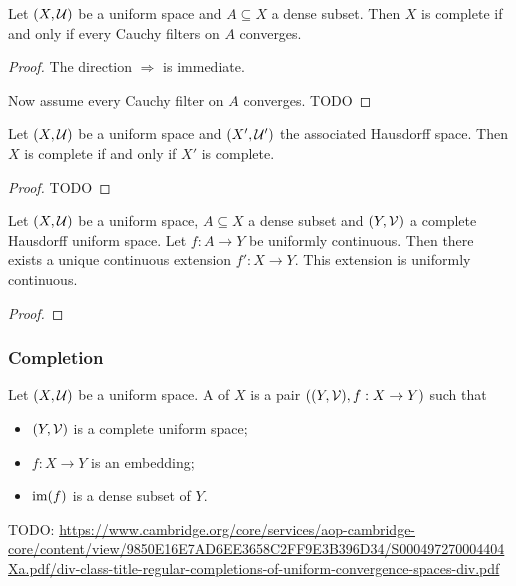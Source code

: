 \begin{proposition}
Let $\sSet{X,\mathcal{U}}$ be a uniform space and $A\subseteq X$ a dense subset. Then $X$ is complete \textup{if and only if} every Cauchy filters on $A$ converges.
\end{proposition}
\begin{proof}
The direction $\Rightarrow$ is immediate.

Now assume every Cauchy filter on $A$ converges. TODO
\end{proof}

\begin{proposition}
Let $\sSet{X,\mathcal{U}}$ be a uniform space and $\sSet{X', \mathcal{U}'}$ the associated Hausdorff space. Then $X$ is complete \textup{if and only if} $X'$ is complete.
\end{proposition}
\begin{proof}
TODO
\end{proof}

\begin{proposition}
Let $\sSet{X,\mathcal{U}}$ be a uniform space, $A\subseteq X$ a dense subset and $\sSet{Y,\mathcal{V}}$ a complete Hausdorff uniform space. Let $f: A\to Y$ be uniformly continuous. Then there exists a unique continuous extension $f': X\to Y$. This extension is uniformly continuous.
\end{proposition}
\begin{proof}

\end{proof}

\subsubsection{Completion}
\begin{definition}
Let $\sSet{X,\mathcal{U}}$ be a uniform space. A  of $X$ is a pair $\sSet{\sSet{Y,\mathcal{V}}, f: X\to Y}$ such that
\begin{itemize}
    \item $\sSet{Y,\mathcal{V}}$ is a complete uniform space;
    \item $f: X\to Y$ is an embedding;
    \item $\operatorname{im}(f)$ is a dense subset of $Y$.
\end{itemize}
\end{definition}

TODO: \url{https://www.cambridge.org/core/services/aop-cambridge-core/content/view/9850E16E7AD6EE3658C2FF9E3B396D34/S000497270004404Xa.pdf/div-class-title-regular-completions-of-uniform-convergence-spaces-div.pdf}

